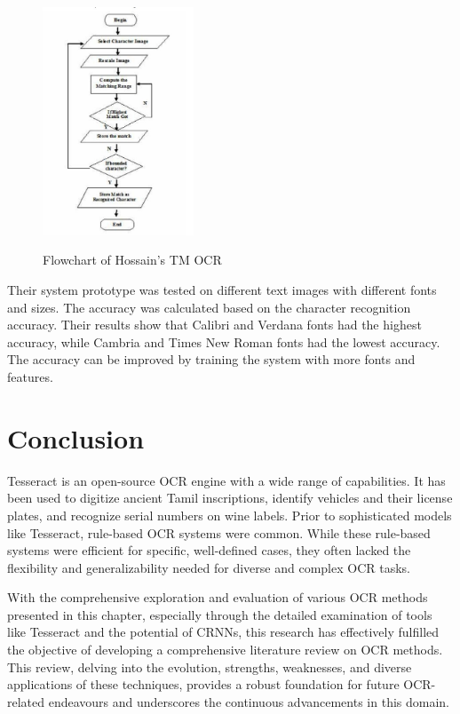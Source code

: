 \begin{figure}[ht]
    \centering
    \includegraphics[width=0.4\textwidth]{Figures/TM_Hossain.jpg}
    \caption[Flowchart of Template Matching OCR]{Flowchart of Hossain's TM OCR}\cite{hossainOpticalCharacterRecognition2019}
    \label{fig:Hossain OCR Template Matching Paper}
\end{figure}

Their system prototype was tested on different text images with different fonts and sizes. The accuracy was calculated based on the character recognition accuracy. Their results show that Calibri and Verdana fonts had the highest accuracy, while Cambria and Times New Roman fonts had the lowest accuracy.  The accuracy can be improved by training the system with more fonts and features. \cite{hossainOpticalCharacterRecognition2019}

\newpage
\section{Conclusion}

Tesseract is an open-source OCR engine with a wide range of capabilities. It has been used to digitize ancient Tamil inscriptions, identify vehicles and their license plates, and recognize serial numbers on wine labels. Prior to sophisticated models like Tesseract, rule-based OCR systems were common. While these rule-based systems were efficient for specific, well-defined cases, they often lacked the flexibility and generalizability needed for diverse and complex OCR tasks.

With the comprehensive exploration and evaluation of various OCR methods presented in this chapter, especially through the detailed examination of tools like Tesseract and the potential of CRNNs, this research has effectively fulfilled the objective of developing a comprehensive literature review on OCR methods. This review, delving into the evolution, strengths, weaknesses, and diverse applications of these techniques, provides a robust foundation for future OCR-related endeavours and underscores the continuous advancements in this domain.

